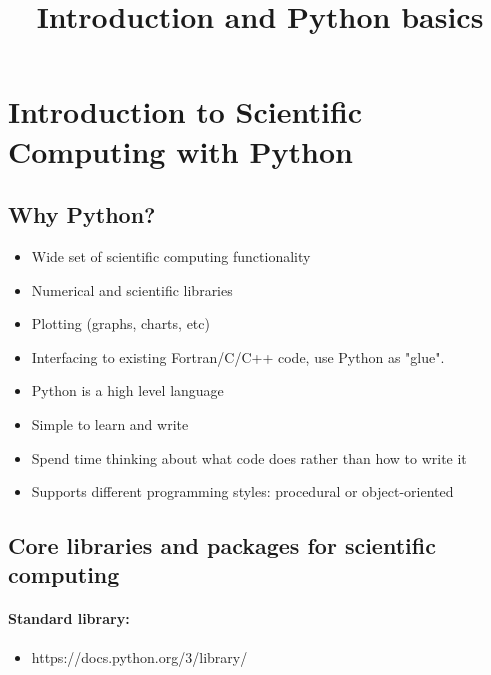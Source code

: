 \documentclass[11pt]{article}
\title{Introduction and Python basics}
\providecommand{\tightlist}{%
      \setlength{\itemsep}{0pt}\setlength{\parskip}{0pt}}
\begin{document}
    
    
    \maketitle
    
    

    
    \section{Introduction to Scientific Computing with
Python}\label{introduction-to-scientific-computing-with-python}

    \subsection{Why Python?}\label{why-python}

\begin{itemize}
\item
  Wide set of scientific computing functionality
\item
  Numerical and scientific libraries
\item
  Plotting (graphs, charts, etc)
\item
  Interfacing to existing Fortran/C/C++ code, use Python as "glue".
\item
  Python is a high level language
\item
  Simple to learn and write
\item
  Spend time thinking about what code does rather than how to write it
\item
  Supports different programming styles: procedural or object-oriented
\end{itemize}

    \subsection{Core libraries and packages for scientific
computing}\label{core-libraries-and-packages-for-scientific-computing}

\paragraph{Standard library:}\label{standard-library}

\begin{itemize}
\tightlist
\item
  https://docs.python.org/3/library/
\end{itemize}
\end{document}
